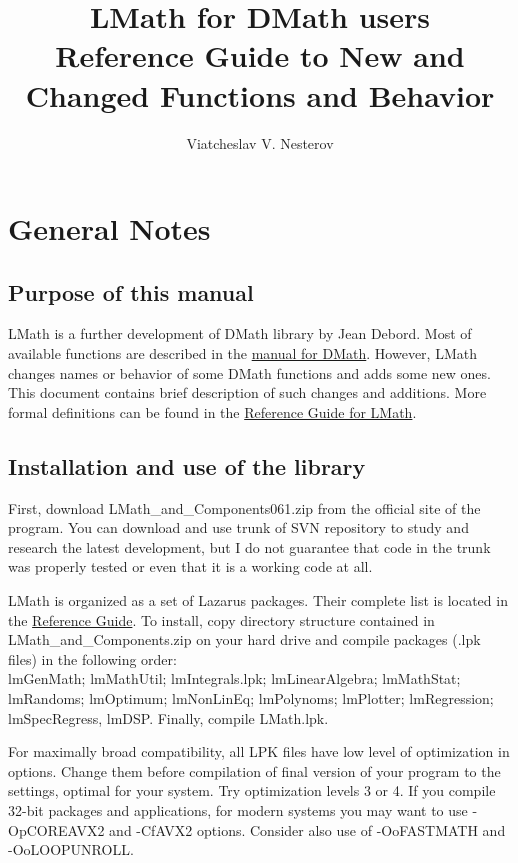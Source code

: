 \documentclass[12pt,a4paper,oneside]{article}
\begin{document}
\title{LMath for DMath users\\
{\Large Reference Guide to New and Changed Functions and Behavior}}
\author{Viatcheslav V. Nesterov}
\maketitle
\newpage
\label{toc}\tableofcontents
\newpage
\newlength{\tmplength}
\section{General Notes}
\subsection{Purpose of this manual}
LMath is a further development of DMath library by Jean Debord. Most of available functions are described in the \hyperref{file:DMath.pdf}{}{}{manual for DMath}. However, LMath changes names or behavior of some DMath functions and adds some new ones. This document contains brief description of such changes and additions. More formal definitions can be found in the \hyperref{file:LMath05.pdf}{}{}{Reference Guide for LMath}.  
\subsection{Installation and use of the library}
First, download LMath\_and\_Components061.zip from the official site of the program. 
You can download and use trunk of SVN repository to study and research the latest development, but I do not guarantee that code in the trunk was properly tested or even that it is a working code at all. 

LMath is organized as a set of Lazarus packages. Their complete list is located in the \hyperref{file:LMath05.pdf}{}{}{Reference Guide}. To install, copy directory structure contained in LMath\_and\_Components.zip on your hard drive and compile packages (.lpk files) in the following order:\\
lmGenMath; lmMathUtil; lmIntegrals.lpk; lmLinearAlgebra; lmMathStat; lmRandoms; lmOptimum; lmNonLinEq; lmPolynoms; lmPlotter; lmRegression; \\ lmSpecRegress, lmDSP. Finally, compile LMath.lpk.
 
For maximally broad compatibility, all LPK files have low level of optimization in options. Change them before compilation of final version of your program to the settings, optimal for your system. Try optimization levels 3 or 4. If you compile 32-bit packages and applications, for modern systems you may want to use -OpCOREAVX2 and -CfAVX2 options. Consider also use of -OoFASTMATH and -OoLOOPUNROLL. 
\end{document}
